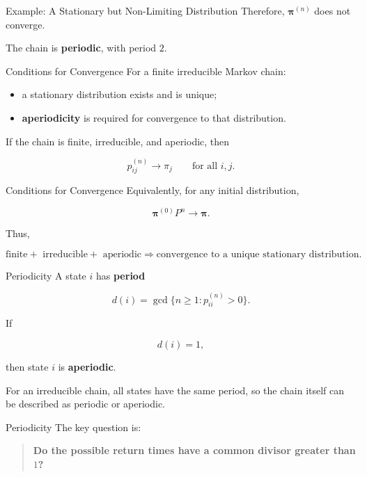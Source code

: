 \documentclass[
  ignorenonframetext,
  aspectratio=169,
]{beamer}
\providecommand{\tightlist}{%
  \setlength{\itemsep}{0pt}\setlength{\parskip}{0pt}}
\begin{document}
\begin{frame}{Example: A Stationary but Non-Limiting Distribution}
\protect{}\label{example-a-stationary-but-non-limiting-distribution-1}
Therefore, \(\boldsymbol{\pi}^{(n)}\) does not converge.

The chain is \textbf{periodic}, with period \(2\).
\end{frame}

\begin{frame}{Conditions for Convergence}
\protect{}\label{conditions-for-convergence}
For a finite irreducible Markov chain:

\begin{itemize}
\tightlist
\item
  a stationary distribution exists and is unique;
\item
  \textbf{aperiodicity} is required for convergence to that
  distribution.
\end{itemize}

If the chain is finite, irreducible, and aperiodic, then

\[
\boxed{
p_{ij}^{(n)}
\longrightarrow
\pi_j
\qquad\text{for all }i,j.
}
\]
\end{frame}

\begin{frame}{Conditions for Convergence}
\protect{}\label{conditions-for-convergence-1}
Equivalently, for any initial distribution,

\[
\boxed{
\boldsymbol{\pi}^{(0)}P^n
\longrightarrow
\boldsymbol{\pi}.
}
\]

Thus,

\[
\boxed{
\text{finite}
+\text{ irreducible}
+\text{ aperiodic}
\Longrightarrow
\text{convergence to a unique stationary distribution}.
}
\]
\end{frame}

\begin{frame}{Periodicity}
\protect{}\label{periodicity}
A state \(i\) has \textbf{period}

\[
d(i)
=
\gcd\{n\geq1:p_{ii}^{(n)}>0\}.
\]

If

\[
d(i)=1,
\]

then state \(i\) is \textbf{aperiodic}.

For an irreducible chain, all states have the same period, so the chain
itself can be described as periodic or aperiodic.
\end{frame}

\begin{frame}{Periodicity}
\protect{}\label{periodicity-1}
The key question is:

\begin{quote}
\textbf{Do the possible return times have a common divisor greater than
\(1\)?}
\end{quote}
\end{frame}
\end{document}
